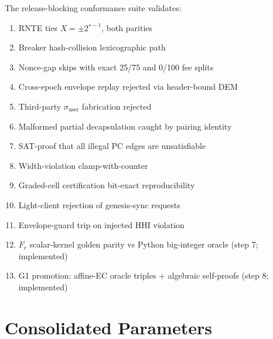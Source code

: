 \documentclass[11pt, a4paper]{article}
\begin{document}
The release-blocking conformance suite validates:

\begin{enumerate}
    \item RNTE ties $X = \pm 2^{s-1}$, both parities
    \item Breaker hash-collision lexicographic path
    \item Nonce-gap skips with exact 25/75 and 0/100 fee splits
    \item Cross-epoch envelope replay rejected via header-bound DEM
    \item Third-party $\sigma_{\text{user}}$ fabrication rejected
    \item Malformed partial decapsulation caught by pairing identity
    \item SAT-proof that all illegal PC edges are unsatisfiable
    \item Width-violation clamp-with-counter
    \item Graded-cell certification bit-exact reproducibility
    \item Light-client rejection of genesis-sync requests
    \item Envelope-guard trip on injected HHI violation
\item $F_r$ scalar-kernel golden parity vs Python big-integer oracle (step 7; implemented)
\item G1 promotion: affine-EC oracle triples + algebraic self-proofs (step 8; implemented)
\end{enumerate}

\section{Consolidated Parameters}
\end{document}

